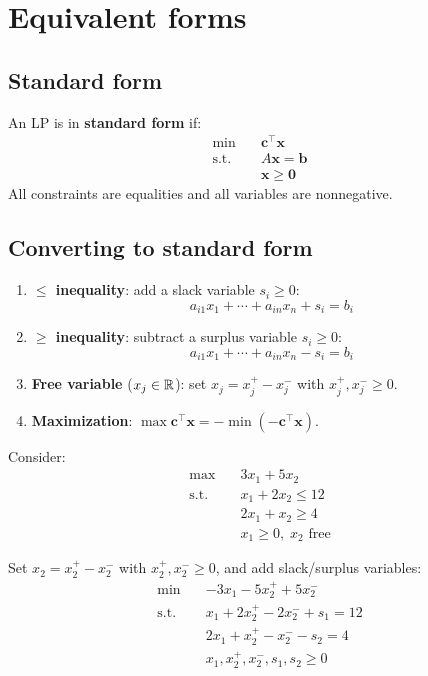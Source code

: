 \section{Equivalent forms}

\subsection{Standard form}

\begin{definition}
An LP is in \textbf{standard form} if:
\[
\begin{aligned}
  \min \quad & \mathbf{c}^\top \mathbf{x} \\
  \text{s.t.} \quad
    & A\mathbf{x} = \mathbf{b} \\
    & \mathbf{x} \ge \mathbf{0}
\end{aligned}
\]
All constraints are equalities and all variables are nonnegative.
\end{definition}

\subsection{Converting to standard form}

\begin{keyformulas}[title=\textbf{Conversion rules}]
\begin{enumerate}
  \item \textbf{$\le$ inequality}: add a slack variable $s_i \ge 0$:
        \[a_{i1}x_1 + \cdots + a_{in}x_n + s_i = b_i\]
  \item \textbf{$\ge$ inequality}: subtract a surplus variable $s_i \ge 0$:
        \[a_{i1}x_1 + \cdots + a_{in}x_n - s_i = b_i\]
  \item \textbf{Free variable} ($x_j \in \mathbb{R}$): set
        $x_j = x_j^+ - x_j^-$ with $x_j^+, x_j^- \ge 0$.
  \item \textbf{Maximization}: $\max \mathbf{c}^\top\mathbf{x} =
        -\min(-\mathbf{c}^\top\mathbf{x})$.
\end{enumerate}
\end{keyformulas}

\begin{example}
Consider:
\[
\begin{aligned}
  \max \quad & 3x_1 + 5x_2 \\
  \text{s.t.} \quad
    & x_1 + 2x_2 \le 12 \\
    & 2x_1 + x_2 \ge 4 \\
    & x_1 \ge 0, \; x_2 \text{ free}
\end{aligned}
\]

Set $x_2 = x_2^+ - x_2^-$ with $x_2^+, x_2^- \ge 0$, and add
slack/surplus variables:
\[
\begin{aligned}
  \min \quad & -3x_1 - 5x_2^+ + 5x_2^- \\
  \text{s.t.} \quad
    & x_1 + 2x_2^+ - 2x_2^- + s_1 = 12 \\
    & 2x_1 + x_2^+ - x_2^- - s_2 = 4 \\
    & x_1, x_2^+, x_2^-, s_1, s_2 \ge 0
\end{aligned}
\]
\end{example}

